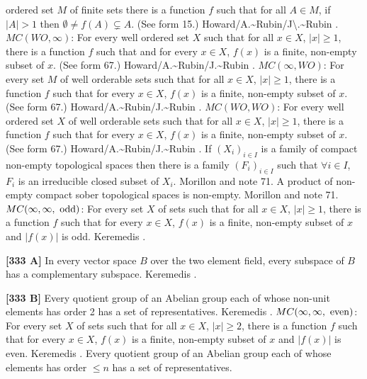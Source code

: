 ordered set $M$ of finite sets there is a function $f$ such that
for all $A\in M$, if $|A|>1$  then $\emptyset\neq f(A)\subsetneq A$.
(See form 15.) \ac{Howard/A.~Rubin/J\.~Rubin} \cite{1997}.
\medskip
{} $MC(WO,\infty)$: For  every well ordered set
$X$ such that for all $x\in X$, $|x|\ge 1$, there is a function $f$
such that and for every $x\in X$, $f(x)$ is a finite,
non-empty subset of $x$. (See form 67.) \ac{Howard/A.~Rubin/J.~Rubin}
\cite{1997}.
\medskip
{} $MC(\infty,WO)$: For  every set $M$ of well
orderable sets such that for all $x\in X$, $|x|\ge 1$, there is a function
$f$ such that for every $x\in X$, $f(x)$ is a finite, non-empty subset
of $x$.  (See form 67.) \ac{Howard/A.~Rubin/J.~Rubin} \cite{1997}.
\medskip
{} $MC(WO,WO)$: For every well ordered set $X$ of
well orderable sets such that for all $x\in X$, $|x|\ge 1$, there is a
function $f$ such that for every $x\in X$, $f(x)$ is a finite, non-empty
subset of $x$.  (See form 67.) \ac{Howard/A.~Rubin/J.~Rubin} \cite{1997}.
\medskip
{} If $(X_i)_{i\in I}$ is a family of compact
non-empty topological spaces then there is a family $(F_i)_{i\in I}$
such that $\forall i\in I$, $F_i$ is an irreducible closed subset of
$X_i$.  \ac{Morillon} \cite{1988} and note 71.
\medskip
{}  A product of non-empty compact sober
topological spaces is non-empty.  \ac{Morillon} \cite{1988} and note 71.
\medskip
{} $MC(\infty,\infty,\hbox{ odd})$: For every
set $X$ of  sets such that for all $x\in X$, $|x|\ge 1$, there is a
function $f$ such that  for every $x\in X$, $f(x)$ is a finite, non-empty
subset of $x$ and $|f(x)|$ is odd. \ac{Keremedis} \cite{1996a}.
\smallskip
\item{}{\bf [333 A]} In every vector space $B$ over the two element field,
every subspace of $B$ has a complementary subspace. \ac{Keremedis}
\cite{1996a}.
\smallskip
\item{}{\bf [333 B]} Every quotient group of an Abelian group each of whose
non-unit elements has order 2 has a set of representatives. \ac{Keremedis}
\cite{1996b}.
\medskip
{} $MC(\infty,\infty,\hbox{ even})$: For every
set $X$ of  sets such that for all $x\in X$, $|x|\ge 2$, there is a
function $f$ such that  for every $x\in X$, $f(x)$ is a finite,
non-empty subset of $x$ and $|f(x)|$ is even. \ac{Keremedis}
\cite{1996a}.
\medskip
{} Every quotient group of an Abelian group
each of whose elements has order  $\le n$ has a set of representatives.
